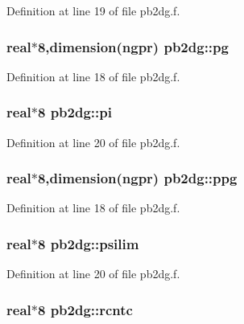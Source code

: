 Definition at line 19 of file pb2dg.f.\hypertarget{namespacepb2dg_11c0f57d1b6cf88b626a7303b39275b8}{
\subsubsection[pg]{\setlength{\rightskip}{0pt plus 5cm}real$\ast$8,dimension(ngpr) {\bf pb2dg::pg}}}
\label{namespacepb2dg_11c0f57d1b6cf88b626a7303b39275b8}




Definition at line 18 of file pb2dg.f.\hypertarget{namespacepb2dg_afbfb864348af51164a5b5600c562bf3}{
\subsubsection[pi]{\setlength{\rightskip}{0pt plus 5cm}real$\ast$8 {\bf pb2dg::pi}}}
\label{namespacepb2dg_afbfb864348af51164a5b5600c562bf3}




Definition at line 20 of file pb2dg.f.\hypertarget{namespacepb2dg_759cca590c253be6ad4e8109bb854bc9}{
\subsubsection[ppg]{\setlength{\rightskip}{0pt plus 5cm}real$\ast$8,dimension(ngpr) {\bf pb2dg::ppg}}}
\label{namespacepb2dg_759cca590c253be6ad4e8109bb854bc9}




Definition at line 18 of file pb2dg.f.\hypertarget{namespacepb2dg_461caa2db520facf89776aa25ef06cae}{
\subsubsection[psilim]{\setlength{\rightskip}{0pt plus 5cm}real$\ast$8 {\bf pb2dg::psilim}}}
\label{namespacepb2dg_461caa2db520facf89776aa25ef06cae}




Definition at line 20 of file pb2dg.f.\hypertarget{namespacepb2dg_6b53ad4b2024949719cfea4dd16feda1}{
\subsubsection[rcntc]{\setlength{\rightskip}{0pt plus 5cm}real$\ast$8 {\bf pb2dg::rcntc}}}
\label{namespacepb2dg_6b53ad4b2024949719cfea4dd16feda1}




